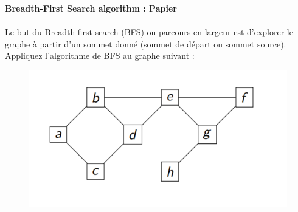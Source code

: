 \begin{Exercice}[5 minutes]\textbf{Breadth-First Search algorithm : Papier
}\\
\\
	Le but du Breadth-first search (BFS) ou parcours en largeur est d'explorer le graphe à partir d’un sommet donné (sommet de départ ou sommet source). \\
	
	Appliquez l’algorithme de BFS au graphe suivant :\\

	\begin{figure}[h!]
        		\centering
       	 	\includegraphics[]{resources/exerciceBFS.png}
	\end{figure}



\end{Exercice}
